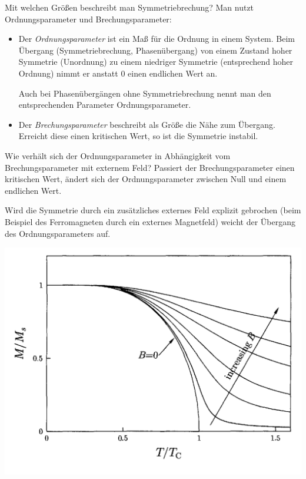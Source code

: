 \begin{fquestion}{Mit welchen Größen beschreibt man Symmetriebrechung?}
    Man nutzt Ordnungsparameter und Brechungsparameter:
    \begin{itemize}
        \item Der \textit{Ordnungsparameter} ist ein Maß für die Ordnung in einem System. Beim Übergang (Symmetriebrechung, Phasenübergang) von einem Zustand hoher Symmetrie (Unordnung) zu einem niedriger Symmetrie (entsprechend hoher Ordnung) nimmt er anstatt $0$ einen endlichen Wert an.
        
        Auch bei Phasenübergängen ohne Symmetriebrechung nennt man den entsprechenden Parameter Ordnungsparameter.
        \item Der \textit{Brechungsparameter} beschreibt als Größe die Nähe zum Übergang. Erreicht diese einen kritischen Wert, so ist die Symmetrie instabil.
    \end{itemize}
\end{fquestion}

\begin{fquestion}{Wie verhält sich der Ordnungsparameter in Abhängigkeit vom Brechungsparameter mit externem Feld?}
    Passiert der Brechungsparameter einen kritischen Wert, ändert sich der Ordnungsparameter zwischen Null und einem endlichen Wert.

    Wird die Symmetrie durch ein zusätzliches externes Feld explizit gebrochen (beim Beispiel des Ferromagneten durch ein externes Magnetfeld) weicht der Übergang des Ordnungsparameters auf.
    \begin{center}
        \includegraphics[width=.7\linewidth]{img/Ordnungsparam_Ext_Feld.png}
    \end{center}
\end{fquestion}

